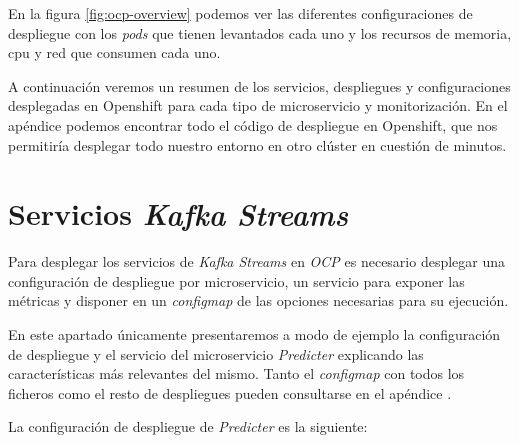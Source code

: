 En la figura \ref{fig:ocp-overview} podemos ver las diferentes configuraciones de despliegue con los \textit{pods} que tienen levantados cada uno y los recursos de memoria, cpu y red que consumen cada uno. 
 
A continuación veremos un resumen de los servicios, despliegues y configuraciones desplegadas en Openshift para cada tipo de microservicio y monitorización. En el apéndice \cite{apendi:contenedores} podemos encontrar todo el código de despliegue en Openshift, que nos permitiría desplegar todo nuestro entorno en otro clúster en cuestión de minutos. 


\section{Servicios \textit{Kafka Streams}}

Para desplegar los servicios de \textit{Kafka Streams} en \textit{OCP} es necesario desplegar una  configuración de despliegue por microservicio, un servicio para exponer las métricas y disponer en un \textit{configmap} de las opciones necesarias para su ejecución. 

En este apartado únicamente presentaremos a modo de ejemplo la configuración de despliegue y el servicio  del microservicio \textit{Predicter} explicando las características más relevantes del mismo. Tanto el \textit{configmap} con todos los ficheros como el resto de despliegues pueden consultarse en el apéndice \cite{apendi:contenedores}. 

La configuración de despliegue de \textit{Predicter} es la siguiente: 

